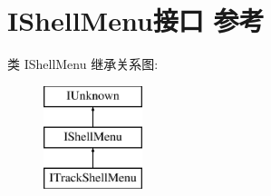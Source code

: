 \hypertarget{interface_i_shell_menu}{}\section{I\+Shell\+Menu接口 参考}
\label{interface_i_shell_menu}
类 I\+Shell\+Menu 继承关系图\+:\begin{figure}[H]
\begin{center}
\leavevmode
\includegraphics[height=3.000000cm]{interface_i_shell_menu}
\end{center}
\end{figure}
